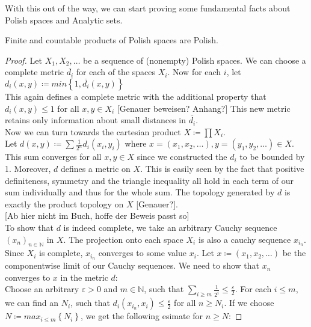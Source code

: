 \documentclass[10pt, a4paper, titlepage]{article}
\numberwithin{equation}{section}
\begin{document}
\begin{theorem}
	
\end{theorem}

With this out of the way, we can start proving some fundamental facts about Polish spaces and Analytic sets. 
\begin{lemma}
	\label{products}
	Finite and countable products of Polish spaces are Polish.
\end{lemma}
\begin{proof}
	Let $X_1,X_2,\ldots$ be a sequence of (nonempty) Polish spaces. We can choose a complete metric $\overline{d_i}$ for each of the spaces $X_i$. 
	Now for each $i$, let $d_i \left( x,y \right) \coloneq min \left\{ 1,\overline{d_i} \left( x,y \right)  \right\}$\\
	This again defines a complete metric with the additional property that $d_i\left( x,y \right) \leq 1$ for all $x,y \in X_i$ [Genauer beweisen? Anhang?]
This new metric retains only information about small distances in $\overline{d_i}$.\\
Now we can turn towards the cartesian product $X \coloneq \prod X_i$.\\
Let $d\left( x,y \right)\coloneq \sum \frac{1}{2^{n}} d_i\left( x_{i},y_{i} \right)$
where $x = \left( x_1,x_2,\ldots \right), y = \left( y_1,y_2,\ldots \right) \in X$. 
This sum converges for all $x,y \in X$ since we constructed the $d_i$ to be bounded by 1.
 Moreover, $d$ defines a metric on $X$. This is easily seen by the fact that positive definiteness, symmetry and the triangle inequality all hold in each term of our sum individually and thus for the whole sum. 
 The topology generated by $d$ is exactly the product topology on $X$ [Genauer?].\\

[Ab hier nicht im Buch, hoffe der Beweis passt so] \\
To show that $d$ is indeed complete, we take an arbitrary Cauchy sequence $(x_{n})_{n \in  \mathbb{N}}$ in $X$. The projection onto each  space $X_i$ is also a cauchy sequence  $x_{i_n}$.
 Since $X_i$ is complete, $x_{i_n}$ converges to some value $x_i$. 
Let $x \coloneq \left( x_1,x_2,\ldots \right) $ be the componentwise limit of our Cauchy sequences. We need to show that $x_{n}$ converges to $x$ in the metric $d$:\\
Choose an arbitrary $\varepsilon > 0 $ and $m \in  \mathbb{N}$, such that $\sum_{i \geq m} \frac{1}{2^i} \leq \frac{\varepsilon}{2} $.
For each $i \leq m$, we can find an  $N_i$, such that $d_i\left( x_{i_n},x_i \right) \leq \frac{\varepsilon}{2}$ for all $n\geq N_i$. 
If we choose $N  \coloneq max_{i \leq m}\left\{ N_i \right\} $, we get the following esimate for $n \geq N$: 


\end{proof}
\end{document}

